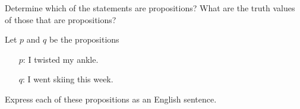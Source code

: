 \documentclass[12pt,addpoints]{exam}
\begin{document}
\begin{questions}
\printanswers

\question[8] Determine which of the statements are propositions? What are the truth values of those that are propositions?
    \begin{solution}
    \end{solution}

\question[10] Let $p$ and $q$ be the propositions
 \begin{itemize}
    \item[$p$:] I twisted my ankle.
    \item[$q$:] I went skiing this week.
 \end{itemize}
 Express each of these propositions as an English sentence.
    \begin{parts}

\end{parts}
\end{questions}
\end{document}
